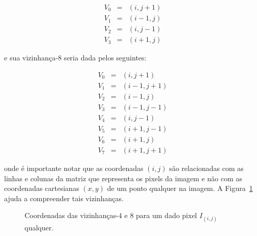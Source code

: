 \begin{eqnarray}
  V_0 & = & (i, j+1) \\
  V_1 & = & (i-1, j) \\
  V_2 & = & (i, j-1) \\
  V_3 & = & (i+1, j)
\end{eqnarray}

\noindent e sua vizinhança-8 seria dada pelos seguintes:

\begin{eqnarray}
  V_0 & = & (i, j+1) \\
  V_1 & = & (i-1, j+1) \\
  V_2 & = & (i-1, j) \\
  V_3 & = & (i-1, j-1) \\
  V_4 & = & (i, j-1) \\
  V_5 & = & (i+1, j-1) \\
  V_6 & = & (i+1, j) \\
  V_7 & = & (i+1, j+1)
\end{eqnarray}

\noindent onde é importante notar que as coordenadas $(i,j)$ são relacionadas
com as linhas e colunas da matriz que representa os pixels da imagem e não com
as coordenadas cartesianas $(x,y)$ de um ponto qualquer na imagem. A
Figura~\ref{fig:vizinhanca} ajuda a compreender tais vizinhanças.

\begin{figure}[ht!]
\begin{center}

\hspace{2pc}

      \caption{Coordenadas das vizinhanças-$4$ e $8$ para um dado pixel
        $I_{(i,j)}$ qualquer.}
        \label{fig:vizinhanca}
\end{center}
\end{figure}

